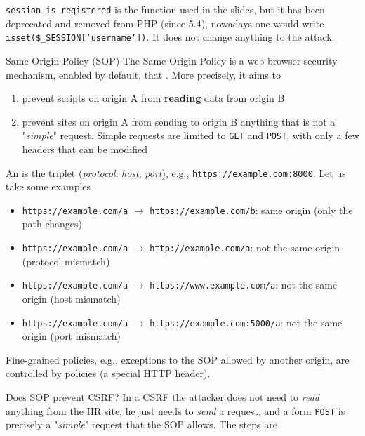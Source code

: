 \begin{framedremark}
    \texttt{session\_is\_registered} is the function used in the slides, but it has been deprecated and removed from PHP (since 5.4), nowadays one would write \texttt{isset(\$\_SESSION['username'])}. It does not change anything to the attack.
\end{framedremark}

\begin{parag}{Same Origin Policy (SOP)}
    The Same Origin Policy is a web browser security mechanism, enabled by default, that . More precisely, it aims to
    \begin{enumerate}
        \item prevent scripts on origin A from \textbf{reading} data from origin B
        \item prevent sites on origin A from sending to origin B anything that is not a "\textit{simple}" request. Simple requests are limited to \texttt{GET} and \texttt{POST}, with only a few headers that can be modified
    \end{enumerate}
    An  is the triplet (\textit{protocol}, \textit{host}, \textit{port}), e.g., \texttt{https://example.com:8000}. Let us take some examples
    \begin{itemize}
        \item \texttt{https://example.com/a} $\to$ \texttt{https://example.com/b}: same origin (only the path changes)
        \item \texttt{https://example.com/a} $\to$ \texttt{http://example.com/a}: not the same origin (protocol mismatch)
        \item \texttt{https://example.com/a} $\to$ \texttt{https://www.example.com/a}: not the same origin (host mismatch)
        \item \texttt{https://example.com/a} $\to$ \texttt{https://example.com:5000/a}: not the same origin (port mismatch)
    \end{itemize}
    Fine-grained policies, e.g., exceptions to the SOP allowed by another origin, are controlled by  policies (a special HTTP header).
    \begin{subparag}{Does SOP prevent CSRF?}
         In a CSRF the attacker does not need to \textit{read} anything from the HR site, he just needs to \textit{send} a request, and a form \texttt{POST} is precisely a "\textit{simple}" request that the SOP allows. The steps are

\end{subparag}
\end{parag}
